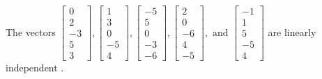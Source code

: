 \begin{exercise}
\begin{exerciseStatement}
  \end{exerciseStatement}
  \begin{exerciseAnswer}
   The vectors \(\left[\begin{array}{r}
0 \\
2 \\
-3 \\
5 \\
3
\end{array}\right] , \left[\begin{array}{r}
1 \\
3 \\
0 \\
-5 \\
4
\end{array}\right] , \left[\begin{array}{r}
-5 \\
5 \\
0 \\
-3 \\
-6
\end{array}\right] , \left[\begin{array}{r}
2 \\
0 \\
-6 \\
4 \\
-5
\end{array}\right] , \text{ and } \left[\begin{array}{r}
-1 \\
1 \\
5 \\
-5 \\
4
\end{array}\right]\) are 
  	 linearly independent  .
  


  \end{exerciseAnswer}
\end{exercise}